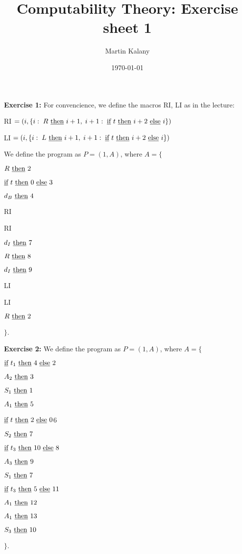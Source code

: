 \documentclass [11pt]{article}
\title{Computability Theory: Exercise sheet 1}
\author{Martin Kalany}
\date{\today}
\newcommand{\IF}{\text{\underline{if} }}
\newcommand{\THEN}{\text{ \underline{then} }}
\newcommand{\ELSE}{\text{ \underline{else} }}
\newcommand{\ITEt}[3]{\ensuremath{\IF t_{#1} \THEN #2 \ELSE #3}}
\newcommand{\ITE}[2]{\ensuremath{\IF t \THEN #1 \ELSE #2}}
\newcommand{\ADD}[2]{\ensuremath{A_{#1} \THEN #2}}
\newcommand{\SUB}[2]{\ensuremath{S_{#1} \THEN #2}}
\newcommand{\gR}[1]{\ensuremath{R \THEN #1}}
\newcommand{\gL}[1]{\ensuremath{L \THEN #1}}
\newcommand{\dI}[1]{\ensuremath{d_I \THEN #1}}
\newcommand{\dB}[1]{\ensuremath{d_B \THEN #1}}
\begin{document}
\maketitle

\bigskip
\noindent
\textbf{Exercise 1:}
For convencience, we define the macros RI, LI as in the lecture:
\begin{compactitem}
\item RI $= (i,  \{
i:\;\gR{i+1},\;
i+1:\;\ITE{i+2}{i}
\})$
\item LI $= (i,  \{
i:\;\gL{i+1},\;
i+1:\;\ITE{i+2}{i}
\})$
\end{compactitem}
We define the program as $P=(1,A)$, where $A = \{$ 
\begin{compactenum}[1:]
\item \gR{2}
\item \ITE{0}{3}
\item \dB{4}
\item RI
\item RI
\item \dI{7}
\item \gR{8}
\item \dI{9}
\item LI
\item LI
\item \gR{2}
\end{compactenum}
$\}$.


\bigskip
\noindent
\textbf{Exercise 2:}
We define the program as $P=(1,A)$, where $A = \{$ 
\begin{compactenum}[1:]
\item \ITEt{1}{4}{2} 
\item \ADD{2}{3}
\item \SUB{1}{1}
\item \ADD{1}{5}
\item \ITE{2}{0}{6}
\item \SUB{2}{7}
\item \ITEt{3}{10}{8}
\item \ADD{3}{9}
\item \SUB{1}{7}
\item \ITEt{3}{5}{11}
\item \ADD{1}{12}
\item \ADD{1}{13}
\item \SUB{3}{10}
\end{compactenum}
$\}$.
\end{document}
